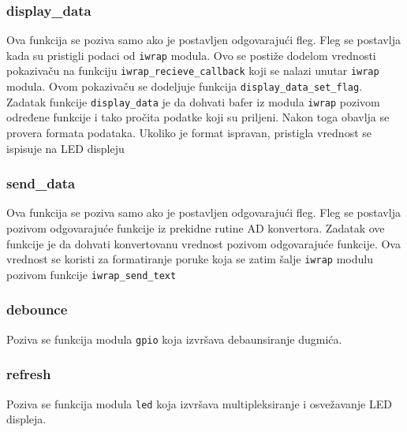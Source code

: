 \subsubsection{display\_data}

Ova funkcija se poziva samo ako je postavljen odgovarajući fleg. Fleg se postavlja kada su pristigli podaci od \verb+iwrap+ modula. Ovo se postiže dodelom vrednosti pokazivaču na funkciju \verb+iwrap_recieve_callback+ koji se nalazi unutar \verb+iwrap+ modula. Ovom pokazivaču se dodeljuje funkcija \verb+display_data_set_flag+. Zadatak funkcije \verb+display_data+ je da dohvati bafer iz modula \verb+iwrap+ pozivom određene funkcije i tako pročita podatke koji su priljeni. Nakon toga obavlja se provera formata podataka. Ukoliko je format ispravan, pristigla vrednost se ispisuje na LED displeju

\subsubsection{send\_data}
Ova funkcija se poziva samo ako je postavljen odgovarajući fleg. Fleg se postavlja pozivom odgovarajuće funkcije iz prekidne rutine AD konvertora. Zadatak ove funkcije je da dohvati konvertovanu vrednost pozivom odgovarajuće funkcije. Ova vrednost se koristi za formatiranje poruke koja se zatim šalje \verb+iwrap+ modulu pozivom funkcije \verb+iwrap_send_text+

\subsubsection{debounce}
Poziva se funkcija modula \verb+gpio+ koja izvršava debaunsiranje dugmića.

\subsubsection{refresh}
Poziva se funkcija modula \verb+led+ koja izvršava multipleksiranje i osvežavanje LED displeja.
